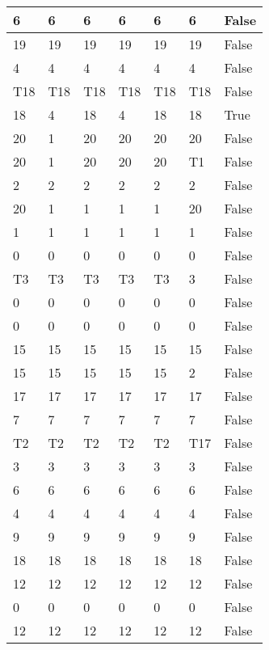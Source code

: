 \begin{longtable}[htbp]{| p{} | p{} | p{}| p{}| p{}| p{}| p{}|}
6 & 6 & 6 & 6 & 6 & 6 & False \\ \hline
19 & 19 & 19 & 19 & 19 & 19 & False \\ \hline
4 & 4 & 4 & 4 & 4 & 4 & False \\ \hline
\multicolumn{1}{|l|}{T18} & \multicolumn{1}{l|}{T18} & \multicolumn{1}{l|}{T18} & \multicolumn{1}{l|}{T18} & \multicolumn{1}{l|}{T18} & \multicolumn{1}{l|}{T18} & False \\ \hline
18 & 4 & 18 & 4 & 18 & 18 & True \\ \hline
20 & 1 & 20 & 20 & 20 & 20 & False \\ \hline
20 & 1 & 20 & 20 & 20 & \multicolumn{1}{l|}{T1} & False \\ \hline
2 & 2 & 2 & 2 & 2 & 2 & False \\ \hline
20 & 1 & 1 & 1 & 1 & 20 & False \\ \hline
1 & 1 & 1 & 1 & 1 & 1 & False \\ \hline
0 & 0 & 0 & 0 & 0 & 0 & False \\ \hline
\multicolumn{1}{|l|}{T3} & \multicolumn{1}{l|}{T3} & \multicolumn{1}{l|}{T3} & \multicolumn{1}{l|}{T3} & \multicolumn{1}{l|}{T3} & 3 & False \\ \hline
0 & 0 & 0 & 0 & 0 & 0 & False \\ \hline
0 & 0 & 0 & 0 & 0 & 0 & False \\ \hline
15 & 15 & 15 & 15 & 15 & 15 & False \\ \hline
15 & 15 & 15 & 15 & 15 & 2 & False \\ \hline
17 & 17 & 17 & 17 & 17 & 17 & False \\ \hline
7 & 7 & 7 & 7 & 7 & 7 & False \\ \hline
\multicolumn{1}{|l|}{T2} & \multicolumn{1}{l|}{T2} & \multicolumn{1}{l|}{T2} & \multicolumn{1}{l|}{T2} & \multicolumn{1}{l|}{T2} & \multicolumn{1}{l|}{T17} & False \\ \hline
3 & 3 & 3 & 3 & 3 & 3 & False \\ \hline
6 & 6 & 6 & 6 & 6 & 6 & False \\ \hline
4 & 4 & 4 & 4 & 4 & 4 & False \\ \hline
9 & 9 & 9 & 9 & 9 & 9 & False \\ \hline
18 & 18 & 18 & 18 & 18 & 18 & False \\ \hline
12 & 12 & 12 & 12 & 12 & 12 & False \\ \hline
0 & 0 & 0 & 0 & 0 & 0 & False \\ \hline
12 & 12 & 12 & 12 & 12 & 12 & False \\ \hline

\end{longtable}
